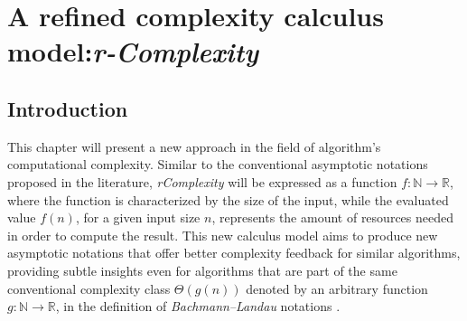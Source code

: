 
\chapter{A refined complexity calculus model:\newline \textbf{\textit{r-Complexity}} }




\section{Introduction}
This chapter will present a new approach in the field of algorithm's computational complexity. Similar to the conventional asymptotic notations proposed in the literature,  \textit{rComplexity} will be expressed as a function $f:\mathbb{N}\longrightarrow\mathbb{R}$, where the function is characterized by the size of the input, while the evaluated value $f(n)$, for a given input size $n$, represents the amount of resources needed in order to compute the result. 
This new calculus model aims to produce new asymptotic notations that offer better complexity feedback for similar algorithms, providing subtle insights even for algorithms that are part of the same conventional complexity class $\Theta(g(n))$ denoted by an arbitrary function $g:\mathbb{N}\longrightarrow\mathbb{R}$, in the definition of \textit{Bachmann–Landau} notations .
